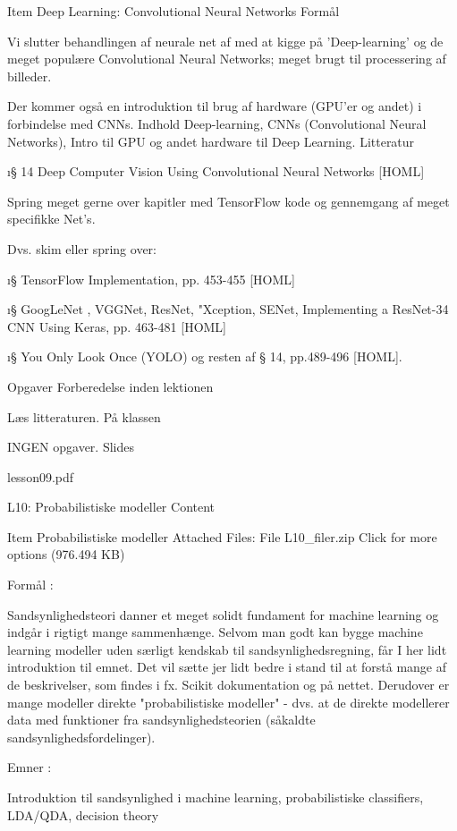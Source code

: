 {    Item
    Deep Learning: Convolutional Neural Networks
    Formål

    Vi slutter behandlingen af neurale net af med at kigge på 'Deep-learning' og de meget populære Convolutional Neural Networks; meget brugt til processering af billeder.

    Der kommer også en introduktion til brug af hardware (GPU'er og andet) i forbindelse med CNNs.
    Indhold
        Deep-learning,
        CNNs (Convolutional Neural Networks),
        Intro til GPU og andet hardware til Deep Learning.
    Litteratur

    \i{§ 14 Deep Computer Vision Using Convolutional Neural Networks} [HOML]

    Spring meget gerne over kapitler med TensorFlow kode og gennemgang af meget specifikke  Net's.

    Dvs.  skim eller spring over:

    \i{§  TensorFlow Implementation},  pp. 453-455 [HOML]

    \i{§  GoogLeNet , VGGNet, ResNet, "Xception, SENet, Implementing a
    ResNet-34 CNN Using Keras}, pp.  463-481 [HOML]

    \i{§ You Only Look Once (YOLO)} og resten af § 14, pp.489-496 [HOML].
    
    Opgaver
    Forberedelse inden lektionen

    Læs litteraturen.
    På klassen

    INGEN opgaver.
    Slides

     lesson09.pdf 


 L10: Probabilistiske modeller
Content

    Item
    Probabilistiske modeller
    Attached Files:
        File L10_filer.zip Click for more options (976.494 KB) 

    Formål :

    Sandsynlighedsteori danner et meget solidt fundament for machine learning og indgår i rigtigt mange sammenhænge. Selvom man godt kan bygge machine learning modeller uden særligt kendskab til sandsynlighedsregning, får I her lidt introduktion til emnet. Det vil sætte jer lidt bedre i stand til at forstå mange af de beskrivelser, som findes i fx. Scikit dokumentation og på nettet. Derudover er mange modeller direkte "probabilistiske modeller" - dvs. at de direkte modellerer data med funktioner fra sandsynlighedsteorien (såkaldte sandsynlighedsfordelinger).


    Emner :

    Introduktion til sandsynlighed i machine learning, probabilistiske classifiers, LDA/QDA, decision theory


}
